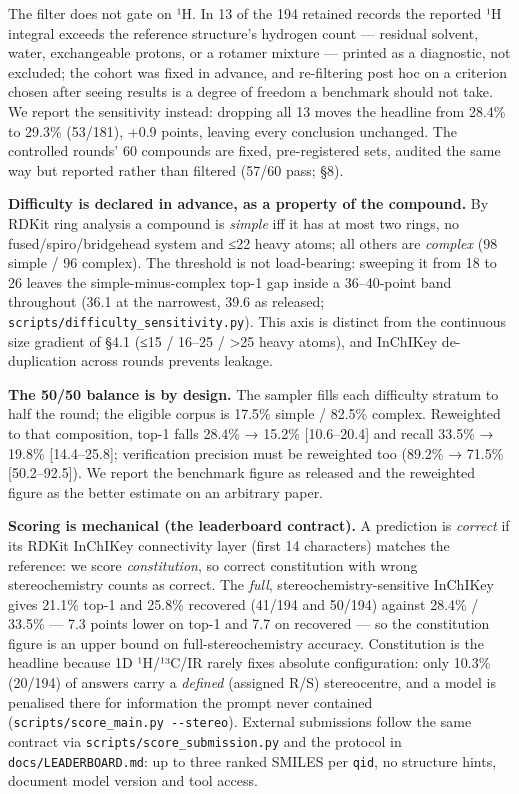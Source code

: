 \documentclass[
  10pt,
]{article}
\begin{document}
The filter does not gate on ¹H. In 13 of the 194 retained records the
reported ¹H integral exceeds the reference structure's hydrogen count
--- residual solvent, water, exchangeable protons, or a rotamer mixture
--- printed as a diagnostic, not excluded; the cohort was fixed in
advance, and re-filtering post hoc on a criterion chosen after seeing
results is a degree of freedom a benchmark should not take. We report
the sensitivity instead: dropping all 13 moves the headline from 28.4\%
to 29.3\% (53/181), +0.9 points, leaving every conclusion unchanged. The
controlled rounds' 60 compounds are fixed, pre-registered sets, audited
the same way but reported rather than filtered (57/60 pass; §8).

\textbf{Difficulty is declared in advance, as a property of the
compound.} By RDKit ring analysis a compound is \emph{simple} iff it has
at most two rings, no fused/spiro/bridgehead system and ≤22 heavy atoms;
all others are \emph{complex} (98 simple / 96 complex). The threshold is
not load-bearing: sweeping it from 18 to 26 leaves the
simple-minus-complex top-1 gap inside a 36--40-point band throughout
(36.1 at the narrowest, 39.6 as released;
\texttt{scripts/\hspace{0pt}difficulty\_sensitivity.py}). This axis is
distinct from the continuous size gradient of §4.1 (≤15 / 16--25 /
\textgreater25 heavy atoms), and InChIKey de-duplication across rounds
prevents leakage.

\textbf{The 50/50 balance is by design.} The sampler fills each
difficulty stratum to half the round; the eligible corpus is 17.5\%
simple / 82.5\% complex. Reweighted to that composition, top-1 falls
28.4\% → 15.2\% {[}10.6--20.4{]} and recall 33.5\% → 19.8\%
{[}14.4--25.8{]}; verification precision must be reweighted too (89.2\%
→ 71.5\% {[}50.2--92.5{]}). We report the benchmark figure as released
and the reweighted figure as the better estimate on an arbitrary paper.

\textbf{Scoring is mechanical (the leaderboard contract).} A prediction
is \emph{correct} if its RDKit InChIKey connectivity layer (first 14
characters) matches the reference: we score \emph{constitution}, so
correct constitution with wrong stereochemistry counts as correct. The
\emph{full}, stereochemistry-sensitive InChIKey gives 21.1\% top-1 and
25.8\% recovered (41/194 and 50/194) against 28.4\% / 33.5\% --- 7.3
points lower on top-1 and 7.7 on recovered --- so the constitution
figure is an upper bound on full-stereochemistry accuracy. Constitution
is the headline because 1D ¹H/¹³C/IR rarely fixes absolute
configuration: only 10.3\% (20/194) of answers carry a \emph{defined}
(assigned R/S) stereocentre, and a model is penalised there for
information the prompt never contained
(\texttt{scripts/score\_main.py\ -\/-stereo}). External submissions
follow the same contract via
\texttt{scripts/\hspace{0pt}score\_submission.py} and the protocol in
\texttt{docs/\hspace{0pt}LEADERBOARD.md}: up to three ranked SMILES per
\texttt{qid}, no structure hints, document model version and tool
access.
\end{document}
